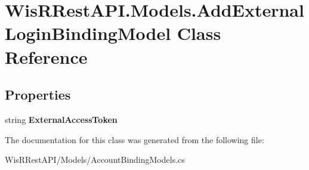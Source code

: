 \hypertarget{class_wis_r_rest_a_p_i_1_1_models_1_1_add_external_login_binding_model}{}\section{Wis\+R\+Rest\+A\+P\+I.\+Models.\+Add\+External\+Login\+Binding\+Model Class Reference}
\label{class_wis_r_rest_a_p_i_1_1_models_1_1_add_external_login_binding_model}
\subsection*{Properties}
\begin{DoxyCompactItemize}
\item 
\hypertarget{class_wis_r_rest_a_p_i_1_1_models_1_1_add_external_login_binding_model_ad32098d8b4983be6af3fb18ef0243127}{}string {\bfseries External\+Access\+Token}\label{class_wis_r_rest_a_p_i_1_1_models_1_1_add_external_login_binding_model_ad32098d8b4983be6af3fb18ef0243127}

\end{DoxyCompactItemize}


The documentation for this class was generated from the following file\+:\begin{DoxyCompactItemize}
\item 
Wis\+R\+Rest\+A\+P\+I/\+Models/Account\+Binding\+Models.\+cs\end{DoxyCompactItemize}
